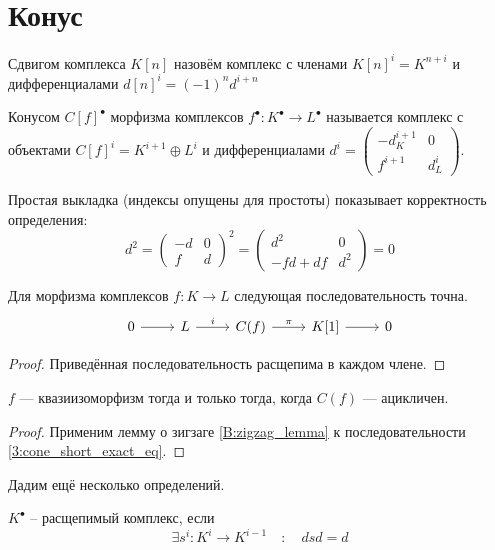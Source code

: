 \documentclass[../main.tex]{subfiles}
\begin{document}
\section{Конус}
\begin{to_def}
Сдвигом комплекса $K[n]$ назовём комплекс с членами $K[n]^i = K^{n+i}$ и дифференциалами $d[n]^i = (-1)^nd^{i+n}$
\end{to_def}
\begin{to_def}
Конусом $C[f]^\bullet$ морфизма комплексов $f^\bullet:K^\bullet\to L^\bullet$ называется комплекс с объектами $C[f]^i = K^{i+1}\oplus L^i$ и дифференциалами $d^i = \begin{pmatrix}-d_K^{i+1}&0\\f^{i+1}&d_L^i\end{pmatrix}$.
\end{to_def}
Простая выкладка (индексы опущены для простоты) показывает корректность определения:
\begin{equation*}
d^2 = \begin{pmatrix}-d&0\\f&d\end{pmatrix}^2 = \begin{pmatrix}d^2&0\\-fd + df&d^2\end{pmatrix} = 0
\end{equation*}
\begin{to_suj}\label{3:cone_short_exact}
Для морфизма комплексов $f:K\to L$ следующая последовательность точна.
\begin{equation}\label{3:cone_short_exact_eq}
    \begin{tikzcd}
	0 & L & {C(f)} & {K[1]} & 0
	\arrow[from=1-1, to=1-2]
	\arrow["i", from=1-2, to=1-3]
	\arrow["\pi", from=1-3, to=1-4]
	\arrow[from=1-4, to=1-5]
\end{tikzcd}
\end{equation}
\end{to_suj}
\begin{proof}
Приведённая последовательность расщепима в каждом члене.
\end{proof}
\begin{to_thr}
$f$ --- квазиизоморфизм тогда и только тогда, когда $C(f)$ --- ацикличен.
\end{to_thr}
\begin{proof}
    Применим лемму о зигзаге \ref{B:zigzag_lemma} к последовательности \eqref{3:cone_short_exact_eq}.
\end{proof}
Дадим ещё несколько определений.
\begin{to_def}
$K^\bullet$ -- расщепимый комплекс, если 
\[\exists s^i\colon K^{i} \to K^{i-1} \quad \colon \quad dsd = d \]
\end{to_def}
\end{document}
